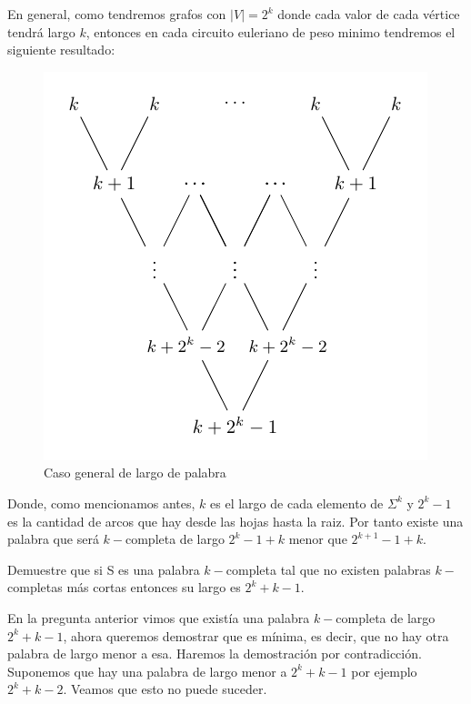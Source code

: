 \documentclass[letterpaper,10pt,table, dvipsnames]{article}
\begin{document}
\newpage

En general, como tendremos grafos con $|V|=2^k$ donde cada valor de cada vértice tendrá largo $k$, entonces en cada circuito euleriano de peso minimo tendremos el siguiente resultado:

\begin{figure}[htbp]
  \centering
  \includegraphics[scale=1]{examples/tree_ex2.pdf}
  \caption{Caso general de largo de palabra}
  \label{fig:ej_gral}
\end{figure}

Donde, como mencionamos antes, $k$ es el largo de cada elemento de $\Sigma^k$ y $2^k - 1$ es la cantidad de arcos que hay desde las hojas hasta la raiz. Por tanto existe una palabra que será $k-$completa de largo $2^k - 1 + k $ menor que $ 2^{k+1} - 1 + k$.

\newpage

\begin{tcolorbox}
  Demuestre que si S es una palabra $k-$completa tal que no existen palabras $k-$completas más cortas entonces su largo es $2^k + k - 1$.
\end{tcolorbox}

En la pregunta anterior vimos que existía una palabra $k-$completa de largo $2^k + k - 1$, ahora queremos demostrar que es mínima, es decir, que no hay otra palabra de largo menor a esa. Haremos la demostración por contradicción. \\

Suponemos que hay una palabra de largo menor a $2^k + k -1$ por ejemplo $2^k + k - 2$. Veamos que esto no puede suceder. \\
\end{document}
